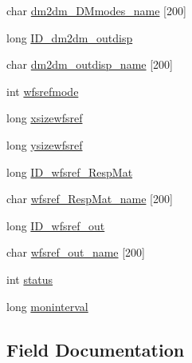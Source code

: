 \begin{DoxyCompactItemize}
char \hyperlink{structAOLOOPCONTROL__DM__DISPCOMB__CONF_aff80725b29f72ec557a85e2af0144f06}{dm2dm\+\_\+\+D\+Mmodes\+\_\+name} \mbox{[}200\mbox{]}
\item 
long \hyperlink{structAOLOOPCONTROL__DM__DISPCOMB__CONF_a7bdd58230071f2708262130dbbca4ace}{I\+D\+\_\+dm2dm\+\_\+outdisp}
\item 
char \hyperlink{structAOLOOPCONTROL__DM__DISPCOMB__CONF_ac3691e17aac5988bc089686b7fd2482b}{dm2dm\+\_\+outdisp\+\_\+name} \mbox{[}200\mbox{]}
\item 
int \hyperlink{structAOLOOPCONTROL__DM__DISPCOMB__CONF_ac7b53922918736ceafc12138a89c389d}{wfsrefmode}
\item 
long \hyperlink{structAOLOOPCONTROL__DM__DISPCOMB__CONF_ac7d2c98efe24bb9e3355e3139c522190}{xsizewfsref}
\item 
long \hyperlink{structAOLOOPCONTROL__DM__DISPCOMB__CONF_a3beacc093a52b32e026717775db3ecfa}{ysizewfsref}
\item 
long \hyperlink{structAOLOOPCONTROL__DM__DISPCOMB__CONF_ac622fc22d1767ee12ace71eea44ae383}{I\+D\+\_\+wfsref\+\_\+\+Resp\+Mat}
\item 
char \hyperlink{structAOLOOPCONTROL__DM__DISPCOMB__CONF_aa8dbc1fcf6792ce8e821010af6b3b2f1}{wfsref\+\_\+\+Resp\+Mat\+\_\+name} \mbox{[}200\mbox{]}
\item 
long \hyperlink{structAOLOOPCONTROL__DM__DISPCOMB__CONF_a6d057826db19c7deb34eb1f8a60017ae}{I\+D\+\_\+wfsref\+\_\+out}
\item 
char \hyperlink{structAOLOOPCONTROL__DM__DISPCOMB__CONF_a97eb0aa752361b8eac7ea9fad655add1}{wfsref\+\_\+out\+\_\+name} \mbox{[}200\mbox{]}
\item 
int \hyperlink{structAOLOOPCONTROL__DM__DISPCOMB__CONF_a0e19e607cfec7426adb8679d155933f5}{status}
\item 
long \hyperlink{structAOLOOPCONTROL__DM__DISPCOMB__CONF_a0e9dd6356232d1f72e5328d758840a1f}{moninterval}
\end{DoxyCompactItemize}


\subsection{Field Documentation}
\hypertarget{structAOLOOPCONTROL__DM__DISPCOMB__CONF_aaf7b746f46a1f3097a3c68fcb1901e3c}{}
